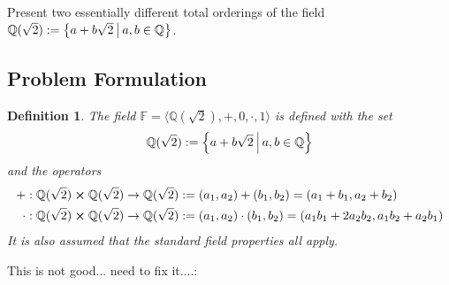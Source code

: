 \documentclass[]{article}
\newcommand{\Rel}{\mathcal{R}}
\newcommand{\Q}{\mathbb{Q}}
\newcommand{\st}{ \ \vline \ }
\newtheorem{definition}{Definition}
\newtheorem{theorem}{Theorem}
\begin{document}
\newpage
\section{}
Present two essentially different total orderings of the field 
$\Q(\sqrt{2}) := \qty{a + b \sqrt{2} \st a,b \in \Q}$.
\subsection*{Problem Formulation}
\begin{definition}
    The field $\mathbb{F} = \langle\Q(\sqrt{2}),+,0,\cdot,1\rangle$ is defined with the set
    $$\Q(\sqrt{2}) := \qty{a + b \sqrt{2} \st a,b \in \Q}$$
    and the operators
    \begin{align*}
        + : \Q(\sqrt{2}) \cross \Q(\sqrt{2}) \to \Q(\sqrt{2}) 
            &:= (a_1,a_2) + (b_1,b_2) = (a_1 + b_1, a_2 + b_2)\\
        \cdot : \Q(\sqrt{2}) \cross \Q(\sqrt{2}) \to \Q(\sqrt{2}) 
            &:= (a_1,a_2) \cdot (b_1,b_2) = (a_1 b_1 + 2 a_2 b_2, a_1 b_2 + a_2 b_1)
    \end{align*}
    It is also assumed that the standard field properties all apply.
\end{definition}


This is not good... need to fix it....:

        
\end{document}
